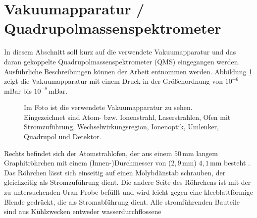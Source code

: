 \section{Vakuumapparatur /
Quadrupolmassenspektrometer}\label{sec:vakuumapparatur_qms}
In diesem Abschnitt soll kurz auf die verwendete Vakuumapparatur und das daran
gekoppelte Quadrupolmassenspektrometer (QMS) eingegangen werden. Ausführliche
Beschreibungen können der Arbeit \cite{blaum:1997:diplomarbeit} entnommen
werden. Abbildung \ref{fig:vakuumapparatur_foto} zeigt die Vakuumapparatur mit
einem Druck in der Größenordnung von $10^{-6}\,$mBar bis $10^{-8}\,$mBar.\par
\begin{figure}[h]
 	\centering
	\caption[Vakuumapparatur]{Im Foto ist die verwendete Vakuumapparatur zu sehen.
	Eingezeichnet sind Atom- bzw. Ionenstrahl, Laserstrahlen,
	Ofen mit Stromzuführung, Wechselwirkungsregion, Ionenoptik, Umlenker,
	Quadrupol und Detektor.}\label{fig:vakuumapparatur_foto}
\end{figure}
Rechts befindet sich der Atomstrahlofen, der aus einem $50\,$mm langem
Graphitröhrchen mit einem (Innen-)Durchmesser von ($2,9\,$mm) $4,1\,$mm besteht \cite{raeder:2006:diplomarbeit}. Das Röhrchen lässt sich einseitig auf einen
Molybdänstab schrauben, der gleichzeitig als Stromzuführung dient. Die andere
Seite des Röhrchens ist mit der zu untersuchenden Uran-Probe befüllt und wird
leicht gegen eine kleeblattförmige Blende gedrückt, die als Stromabführung dient. Alle
stromführenden Bauteile sind aus Kühlzwecken entweder wasserdurchflossene
